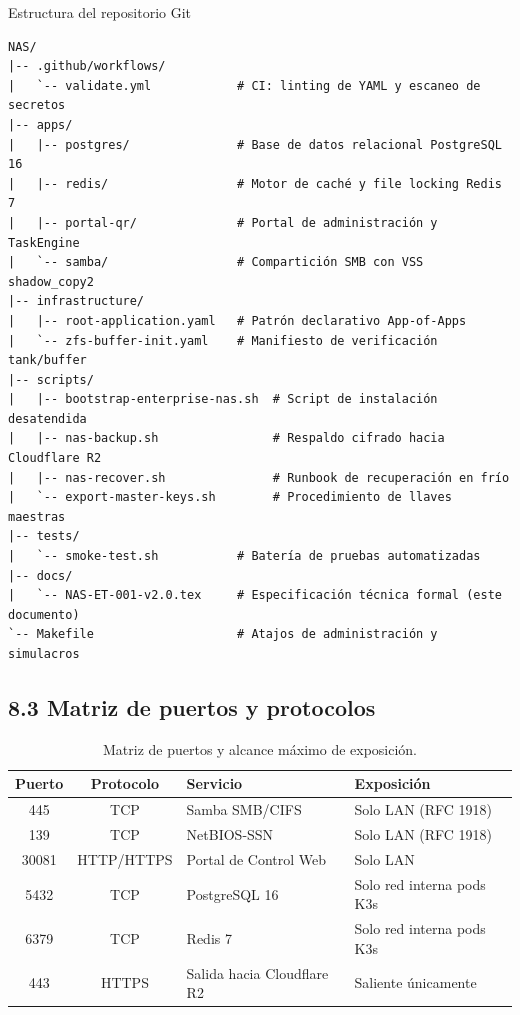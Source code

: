 \documentclass[10pt,a4paper]{article}
\begin{document}
\begin{stepbox}{Estructura del repositorio Git}
\begin{verbatim}
NAS/
|-- .github/workflows/
|   `-- validate.yml            # CI: linting de YAML y escaneo de secretos
|-- apps/
|   |-- postgres/               # Base de datos relacional PostgreSQL 16
|   |-- redis/                  # Motor de caché y file locking Redis 7
|   |-- portal-qr/              # Portal de administración y TaskEngine
|   `-- samba/                  # Compartición SMB con VSS shadow_copy2
|-- infrastructure/
|   |-- root-application.yaml   # Patrón declarativo App-of-Apps
|   `-- zfs-buffer-init.yaml    # Manifiesto de verificación tank/buffer
|-- scripts/
|   |-- bootstrap-enterprise-nas.sh  # Script de instalación desatendida
|   |-- nas-backup.sh                # Respaldo cifrado hacia Cloudflare R2
|   |-- nas-recover.sh               # Runbook de recuperación en frío
|   `-- export-master-keys.sh        # Procedimiento de llaves maestras
|-- tests/
|   `-- smoke-test.sh           # Batería de pruebas automatizadas
|-- docs/
|   `-- NAS-ET-001-v2.0.tex     # Especificación técnica formal (este documento)
`-- Makefile                    # Atajos de administración y simulacros
\end{verbatim}
\end{stepbox}

\subsection{8.3 Matriz de puertos y protocolos}

\begin{table}[htbp]
\centering
\small
\caption{Matriz de puertos y alcance máximo de exposición.}
\label{tab:puertos}
\begin{tabular}{|c|c|p{4.5cm}|p{4.5cm}|}
\hline
\textbf{\textsf{Puerto}} & \textbf{\textsf{Protocolo}} & \textbf{\textsf{Servicio}} & \textbf{\textsf{Exposición}} \\
\hline
445 & TCP & Samba SMB/CIFS & Solo LAN (RFC 1918) \\
\hline
139 & TCP & NetBIOS-SSN & Solo LAN (RFC 1918) \\
\hline
30081 & HTTP/HTTPS & Portal de Control Web & Solo LAN \\
\hline
5432 & TCP & PostgreSQL 16 & Solo red interna pods K3s \\
\hline
6379 & TCP & Redis 7 & Solo red interna pods K3s \\
\hline
443 & HTTPS & Salida hacia Cloudflare R2 & Saliente únicamente \\
\hline
\end{tabular}
\end{table}
\end{document}
